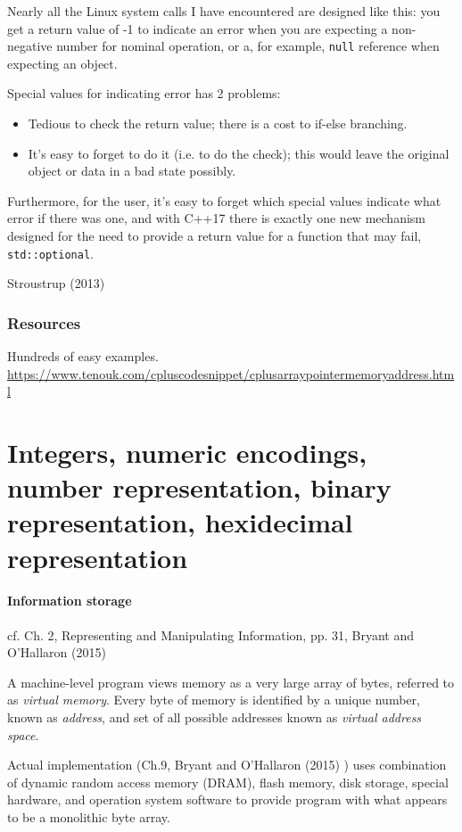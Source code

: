 \documentclass[10pt]{amsart}
\begin{document}
\begin{multicols*}{2}
Nearly all the Linux system calls I have encountered are designed like this: you get a return value of -1 to indicate an error when you are expecting a non-negative number for nominal operation, or a, for example, \verb|null| reference when expecting an object. 

Special values for indicating error has 2 problems:
\begin{itemize}
	\item Tedious to check the return value; there is a cost to if-else branching.
	\item It's easy to forget to do it (i.e. to do the check); this would leave the original object or data in a bad state possibly.
\end{itemize}
Furthermore, for the user, it's easy to forget which special values indicate what error if there was one, and with C++17 there is exactly one new mechanism designed for the need to provide a return value for a function that may fail, \verb|std::optional|.


Stroustrup (2013) \cite{Stro2013}

\section{Resources}

Hundreds of easy examples.
\url{https://www.tenouk.com/cpluscodesnippet/cplusarraypointermemoryaddress.html}

\part{Integers, numeric encodings, number representation, binary representation, hexidecimal representation}


\subsection{Information storage}

cf. Ch. 2, Representing and Manipulating Information, pp. 31, Bryant and O'Hallaron (2015) \cite{BrOH2016}

A machine-level program views memory as a very large array of bytes, referred to as \emph{virtual memory}. Every byte of memory is identified by a unique number, known as \emph{address}, and set of all possible addresses known as \emph{virtual address space}. 

Actual implementation (Ch.9, Bryant and O'Hallaron (2015) \cite{BrOH2016}) uses combination of dynamic random access memory (DRAM), flash memory, disk storage, special hardware, and operation system software to provide program with what appears to be a monolithic byte array.


\end{multicols*}
\end{document}
